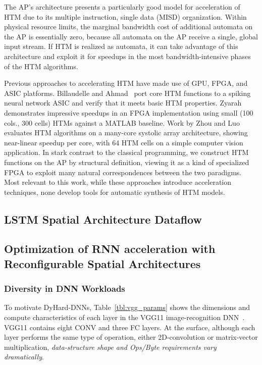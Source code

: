 The AP's architecture presents a particularly good model for acceleration of HTM due to its multiple instruction, single data (MISD) organization.
Within physical resource limits, the marginal bandwidth cost of additional automata on the AP is essentially zero, because all automata on the AP receive a single, global input stream.
If HTM is realized as automata, it can take advantage of this architecture and exploit it for speedups in the most bandwidth-intensive phases of the HTM algorithms.

Previous approaches to accelerating HTM have made use of GPU, FPGA, and ASIC platforms.
Billaudelle and Ahmad~\cite{BillaudelleAhmad} port core HTM functions to a spiking neural network ASIC and verify that it meets basic HTM properties. 
Zyarah~\cite{FPGAThesis} demonstrates impressive speedups in an FPGA implementation using small (100 cols., 300 cells) HTMs against a MATLAB baseline. 
Work by Zhou and Luo~\cite{EpiphanyThesis} evaluates HTM algorithms on a many-core systolic array architecture, showing near-linear speedup per core, with 64 HTM cells on a simple computer vision application.
In stark contrast to the classical programming, we construct HTM functions on the AP by structural definition, viewing it as a kind of specialized FPGA to exploit many natural correspondences between the two paradigms. 
Most relevant to this work, while these approaches introduce acceleration techniques, none develop tools for automatic synthesis of HTM models.

\subsection{LSTM Spatial Architecture Dataflow}

\subsection{Optimization of RNN acceleration with Reconfigurable Spatial Architectures}

\subsubsection{Diversity in DNN Workloads}

To motivate DyHard-DNNs, Table~\ref{tbl:vgg_params} shows the dimensions and compute characteristics of each layer in the VGG11 image-recognition DNN~\cite{simonyan2014very}.
VGG11 contains eight CONV and three FC layers.
At the surface, although each layer performs the same type of operation, either 2D-convolution or matrix-vector multiplication, \emph{data-structure shape and Ops/Byte requirements vary dramatically}.

